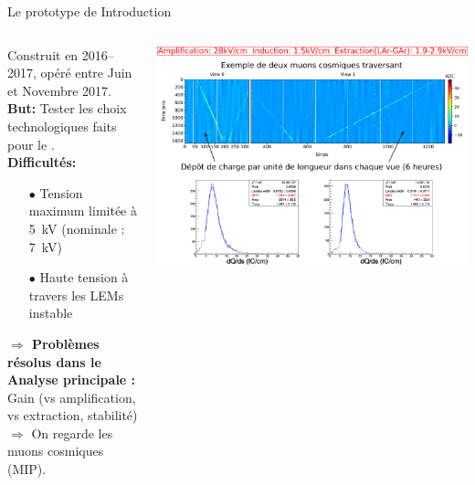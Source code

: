     \begin{frame}{Le prototype de \TOO{}}{Introduction}
    	\begin{scriptsize}
    		\vfill
    		\begin{columns}
    			\begin{column}{0.35\textwidth}
    				Construit en 2016--2017, opéré entre Juin et Novembre 2017.\\
    				\vspace{0.3cm}
    				\textbf{But:} Tester les choix technologiques faits pour le \SSS{}.\\
    				\vspace{0.3cm}
    				\textbf{Difficultés:} 
    				\begin{itemize}
    					\item[$\bullet$] Tension maximum limitée à \SI{5}{\kilo\volt} (nominale : \SI{7}{\kilo\volt})
    					\item[$\bullet$] Haute tension à travers les LEMs instable
    				\end{itemize}
    				\textbf{$\Rightarrow$ Problèmes résolus dans le \SSS{}} \\
    				\vspace{0.3cm}
    				\textbf{Analyse principale :} Gain (vs amplification, vs extraction, stabilité)\\
    				$\Rightarrow$ On regarde les muons cosmiques (MIP).
    			\end{column}\hfill
    			\begin{column}{0.65\textwidth}
    				\includegraphics[width=\textwidth]{./pictures/run840.png}\\
    			\end{column}
    		\end{columns}
	    \end{scriptsize}
    \end{frame}

